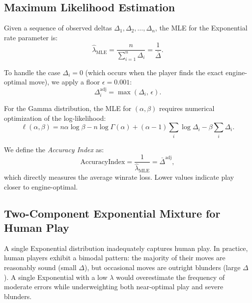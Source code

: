\documentclass[11pt,a4paper]{article}
\begin{document}
\subsection{Maximum Likelihood Estimation}

Given a sequence of observed deltas $\Delta_1, \Delta_2, \ldots, \Delta_n$,
the MLE for the Exponential rate parameter is:
\begin{equation}
    \hat{\lambda}_{\text{MLE}} = \frac{n}{\sum_{i=1}^{n} \Delta_i}
    = \frac{1}{\bar{\Delta}}.
    \label{eq:lambda_mle}
\end{equation}

To handle the case $\Delta_i = 0$ (which occurs when the player finds the
exact engine-optimal move), we apply a floor $\epsilon = 0.001$:
\begin{equation}
    \Delta_i^{\text{adj}} = \max(\Delta_i, \, \epsilon).
    \label{eq:delta_adj}
\end{equation}

For the Gamma distribution, the MLE for $(\alpha, \beta)$ requires
numerical optimization of the log-likelihood:
\begin{equation}
    \ell(\alpha,\beta) = n\alpha\log\beta - n\log\Gamma(\alpha)
    + (\alpha-1)\sum_{i}\log\Delta_i - \beta\sum_{i}\Delta_i.
    \label{eq:gamma_mle}
\end{equation}

We define the \emph{Accuracy Index} as:
\begin{equation}
    \text{AccuracyIndex} = \frac{1}{\hat{\lambda}_{\text{MLE}}} = \bar{\Delta}^{\text{adj}},
    \label{eq:accuracy_index}
\end{equation}
which directly measures the average winrate loss. Lower values indicate play
closer to engine-optimal.


\subsection{Two-Component Exponential Mixture for Human Play}
\label{sec:mixture}

A single Exponential distribution inadequately captures human play. In
practice, human players exhibit a bimodal pattern: the majority of their moves
are reasonably sound (small $\Delta$), but occasional moves are outright
blunders (large $\Delta$). A single Exponential with a low $\lambda$ would
overestimate the frequency of moderate errors while underweighting both
near-optimal play and severe blunders.
\end{document}

